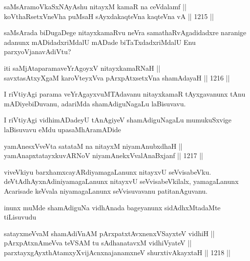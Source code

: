 
\begin{shl}
saMsAramoVkaSxNAyA\s \s shu nitayxM kamaR na ceVdalamf || \\
koV\s thaRsetxVneVha puMsaH sAyxdakaqteVna kaqteVna vA \hfill || 1215 ||  
\end{shl}

\begin{artha}
saMsArada biDugaDege nitayxkamaRvu neVra samathaRvAgadidadxre naranige adanunx mADidadxriMdalU mADade biTaTxdadxriMdalU Enu parxyoVjanavAdiVtu?
\end{artha}

\begin{shl}
iti saMjAtaparamaveYrAgoyxV nitayxkamaRNaH || \\
savxtasAtxyXgaM karoVteyxVva pArxpAtxsetxVna shamAdayaH \hfill || 1216 ||  
\end{shl}

\begin{artha}
I riVtiyAgi parama veYrAgayxvuMTAdavanu nitayxkamaR tAyxgavanunx tAnu mADiyebiDuvanu, adariMda shamAdiguNagaLu laBisuvavu.
\end{artha}

\begin{center}
I riVtiyAgi vidhimADadeyU tAnAgiyeV shamAdiguNagaLu mumukuSxvige laBisuvavu eMdu upasaMhAramADide
\end{center}


\begin{shl}
yamAnesxVveVta satataM na nitayxM niyamAnubxdhaH || \\
yamAnapxtatayxkuvARNoV niyamAnekxVvalAnaBxjanf \hfill || 1217 ||  
\end{shl}

\begin{artha}
viveVkiyu barxhamxcayARdiyamagaLanunx nitayxvU seVvisabeVku. deVtAdhAyxnAdiniyamagaLanunx nitayxvU seVvisabeVkilalx, yamagaLanunx Acarisade keVvala niyamagaLanunx seVvisuvavanu patitanAguvanu.
\end{artha}

\begin{center}
inunx muMde shamAdiguNa vidhAnada bageyanunx sidAdhxMtadaMte tiLisuvudu
\end{center}


\begin{shl}
satayxmeVvaM shamAdiVnAM pArxpatxtAvxnenxVSayxteV vidhiH || \\
pArxpAtxnAmeVva teVSAM tu sAdhanatavxM vidhiVyateV || \\
parxtayxgAyxthAtamxyXvijAcnxnajanamxneV shurxtivAkayxtaH \hfill || 1218 ||  
\end{shl}

